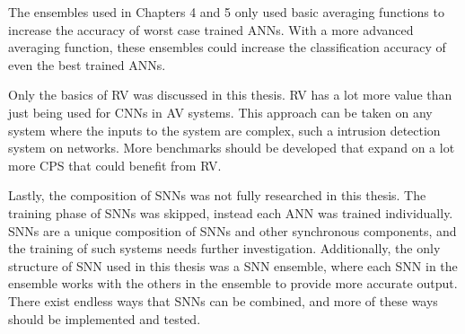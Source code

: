 The ensembles used in Chapters 4 and 5 only used basic averaging functions to increase the accuracy of worst case trained \acp{ANN}.
With a more advanced averaging function, these ensembles could increase the classification accuracy of even the best trained \acp{ANN}.

Only the basics of \ac{RV} was discussed in this thesis.
\ac{RV} has a lot more value than just being used for \acp{CNN} in \ac{AV} systems.
This approach can be taken on any system where the inputs to the system are complex, such a intrusion detection system on networks. 
More benchmarks should be developed that expand on a lot more \ac{CPS} that could benefit from \ac{RV}.

Lastly, the composition of \acp{SNN} was not fully researched in this thesis.
The training phase of \acp{SNN} was skipped, instead each \ac{ANN} was trained individually.
\acp{SNN} are a unique composition of \acp{SNN} and other synchronous components, and the training of such systems needs further investigation.
Additionally, the only structure of \ac{SNN} used in this thesis was a \ac{SNN} ensemble, where each \ac{SNN} in the ensemble works with the others in the ensemble to provide more accurate output.
There exist endless ways that \acp{SNN} can be combined, and more of these ways should be implemented and tested.










